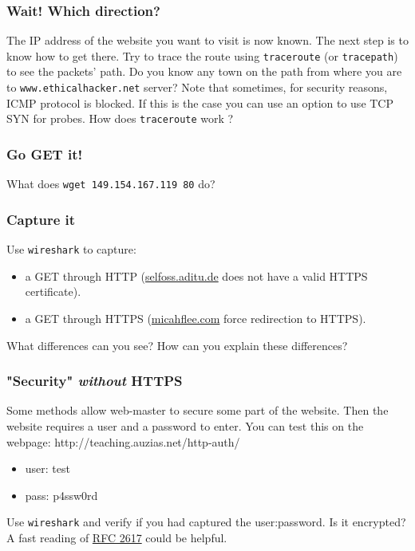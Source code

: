 \documentclass[11pt]{article}
\begin{document}
\subsubsection{Wait! Which direction?}
The IP address of the website you want to visit is now known. The next step is to know how to get there. Try to trace the route using \verb"traceroute" (or \verb"tracepath") to see the packets' path. Do you know any town on the path from where you are to \verb"www.ethicalhacker.net" server?
Note that sometimes, for security reasons, ICMP protocol is blocked. If this is the case you can use an option to use TCP SYN for probes.
How does \verb"traceroute" work ?

\subsubsection{Go GET it!}
What does \verb"wget 149.154.167.119 80" do?

\subsubsection{Capture it}
Use \verb"wireshark" to capture:
\begin{itemize}
  \item a GET through HTTP (\color{blue}\href{http://selfoss.aditu.de/}{selfoss.aditu.de}\color{black} does not have a valid HTTPS certificate).
  \item a GET through HTTPS (\color{blue}\href{https://micahflee.com/}{micahflee.com}\color{black} force redirection to HTTPS).
\end{itemize}
What differences can you see? How can you explain these differences?

\subsubsection{"Security" \emph{without} HTTPS}
Some methods allow web-master to secure some part of the website. Then the website requires a user and a password to enter. You can test this on the webpage: http://teaching.auzias.net/http-auth/
\begin{itemize}
  \item user: test
  \item pass: p4ssw0rd
\end{itemize}
Use \verb"wireshark" and verify if you had captured the user:password. Is it encrypted? A fast reading of \color{blue}\href{http://tools.ietf.org/html/rfc2617}{RFC 2617}\color{black} could be helpful.
\end{document}
